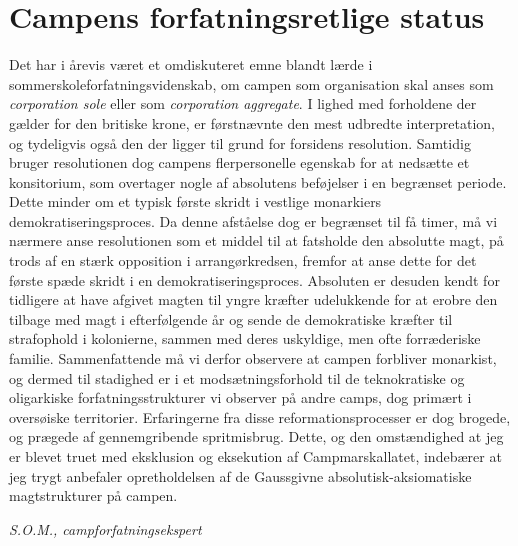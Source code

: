 \begin{minipage}[t]{100mm}
\vspace{1mm}
\section*{Campens forfatningsretlige status}
Det har i årevis været et omdiskuteret emne blandt lærde i sommerskoleforfatningsvidenskab, om campen som organisation skal anses som \emph{corporation sole} eller som \emph{corporation aggregate}. I lighed med forholdene der gælder for den britiske krone, er førstnævnte den mest udbredte interpretation, og tydeligvis også den der ligger til grund for forsidens resolution. Samtidig bruger resolutionen dog campens flerpersonelle egenskab for at nedsætte et konsitorium, som overtager nogle af absolutens beføjelser i en begrænset periode. Dette minder om et typisk første skridt i vestlige monarkiers demokratiseringsproces. Da denne afståelse dog er begrænset til få timer, må vi nærmere anse resolutionen som et middel til at fatsholde den absolutte magt, på trods af en stærk opposition i arrangørkredsen, fremfor at anse dette for det første spæde skridt i en demokratiseringsproces. Absoluten er desuden kendt for tidligere at have afgivet magten til yngre kræfter udelukkende for at erobre den tilbage med magt i efterfølgende år og sende de demokratiske kræfter til strafophold i kolonierne, sammen med deres uskyldige, men ofte forræderiske familie. Sammenfattende må vi derfor observere at campen forbliver monarkist, og dermed til stadighed er i et modsætningsforhold til de teknokratiske og oligarkiske forfatningsstrukturer vi observer på andre camps, dog primært i oversøiske territorier. Erfaringerne fra disse reformationsprocesser er dog brogede, og prægede af gennemgribende spritmisbrug.  Dette, og den omstændighed at jeg er blevet truet med eksklusion og eksekution af Campmarskallatet, indebærer at jeg trygt anbefaler opretholdelsen af de Gaussgivne absolutisk-aksiomatiske magtstrukturer på campen.

{\flushright\emph{S.O.M., campforfatningsekspert}}


\end{minipage}
